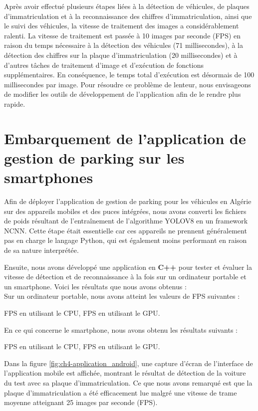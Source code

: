 Après avoir effectué plusieurs étapes liées à la détection de véhicules, de plaques d'immatriculation et à la reconnaissance des chiffres d'immatriculation, ainsi que le suivi des véhicules, la vitesse de traitement des images a considérablement ralenti. La vitesse de traitement est passée à 10 images par seconde (FPS) en raison du temps nécessaire à la détection des véhicules (71 millisecondes), à la détection des chiffres sur la plaque d'immatriculation (20 millisecondes) et à d'autres tâches de traitement d'image et d'exécution de fonctions supplémentaires. En conséquence, le temps total d'exécution est désormais de 100 millisecondes par image. Pour résoudre ce problème de lenteur, nous envisageons de modifier les outils de développement de l'application  afin de le rendre plus rapide.

\section{Embarquement de l'application de gestion de parking sur les smartphones}

Afin de déployer l'application de gestion de parking pour les véhicules en Algérie sur des appareils mobiles et des puces intégrées, nous avons converti les fichiers de poids résultant de l'entraînement de l'algorithme YOLOV8 en un framework NCNN. Cette étape était essentielle car ces appareils ne prennent généralement pas en charge le langage Python, qui est également moins performant en raison de sa nature interprétée.

Ensuite, nous avons développé une application en \textbf{C++} pour tester et évaluer la vitesse de détection et de reconnaissance à la fois sur un ordinateur portable et un smartphone. Voici les résultats que nous avons obtenus :\\
Sur un ordinateur portable, nous avons atteint les valeurs de FPS suivantes :
\begin{outline}
     FPS en utilisant le CPU,
     FPS en utilisant le GPU.    
\end{outline}

En ce qui concerne le smartphone, nous avons obtenu les résultats suivants :
\begin{outline}
     FPS en utilisant le CPU,
     FPS en utilisant le GPU.
\end{outline}

Dans la figure \ref{fig:ch4-application_android}, une capture d'écran de l'interface de l'application mobile est affichée, montrant le résultat de détection de la voiture du test avec sa plaque d'immatriculation. Ce que nous avons remarqué est que la plaque d'immatriculation a été efficacement lue  malgré une vitesse de trame moyenne atteignant 25 images par seconde (FPS).


